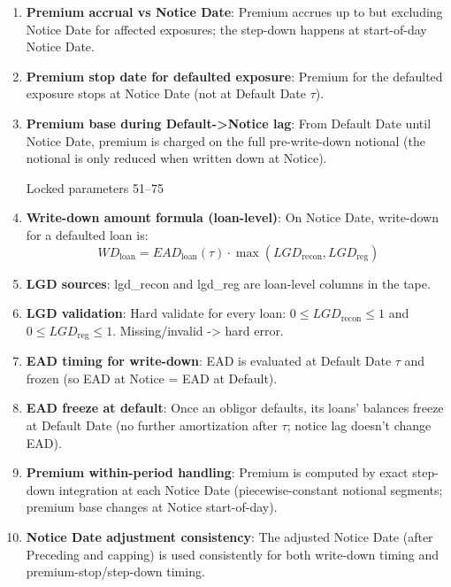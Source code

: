 \documentclass[11pt]{article}
\begin{document}
\begin{enumerate}[label=\arabic*),leftmargin=*,align=left]
\item \textbf{Premium accrual vs Notice Date}: Premium accrues up to but excluding Notice Date for affected exposures; the step-down happens at start-of-day Notice Date.

\item \textbf{Premium stop date for defaulted exposure}: Premium for the defaulted exposure stops at Notice Date (not at Default Date $\tau$).

\item \textbf{Premium base during Default->Notice lag}: From Default Date until Notice Date, premium is charged on the full pre-write-down notional (the notional is only reduced when written down at Notice).

\vspace{1em}
\noindent Locked parameters 51–75
\vspace{0.5em}

\item \textbf{Write-down amount formula (loan-level)}: On Notice Date, write-down for a defaulted loan is:
\[ WD_{\text{loan}} = EAD_{\text{loan}}(\tau) \cdot \max(LGD_{\text{recon}}, LGD_{\text{reg}}) \]

\item \textbf{LGD sources}: lgd\_recon and lgd\_reg are loan-level columns in the tape.

\item \textbf{LGD validation}: Hard validate for every loan: $0 \le LGD_{\text{recon}} \le 1$ and $0 \le LGD_{\text{reg}} \le 1$. Missing/invalid -> hard error.

\item \textbf{EAD timing for write-down}: EAD is evaluated at Default Date $\tau$ and frozen (so EAD at Notice = EAD at Default).

\item \textbf{EAD freeze at default}: Once an obligor defaults, its loans’ balances freeze at Default Date (no further amortization after $\tau$; notice lag doesn’t change EAD).

\item \textbf{Premium within-period handling}: Premium is computed by exact step-down integration at each Notice Date (piecewise-constant notional segments; premium base changes at Notice start-of-day).

\item \textbf{Notice Date adjustment consistency}: The adjusted Notice Date (after Preceding and capping) is used consistently for both write-down timing and premium-stop/step-down timing.


\end{enumerate}
\end{document}

